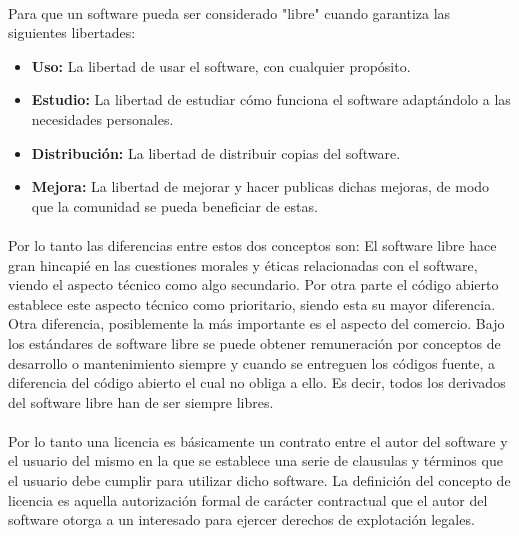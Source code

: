 \documentclass[10pt]{article}
\begin{document}
            \paragraph{}
            Para que un software pueda ser considerado "libre" cuando garantiza las siguientes libertades:
            \begin{itemize}
            \item \textbf{Uso:} La libertad de usar el software, con cualquier propósito.
            \item \textbf{Estudio:} La libertad de estudiar cómo funciona el software adaptándolo a las necesidades personales.
            \item \textbf{Distribución:} La libertad de distribuir copias del software.
            \item \textbf{Mejora:} La libertad de mejorar y hacer publicas dichas mejoras, de modo que la comunidad se pueda beneficiar de estas.
            \end{itemize}
            
            \paragraph{}
            Por lo tanto las diferencias entre estos dos conceptos son: El software libre hace gran hincapié en las cuestiones morales y éticas relacionadas con el software, viendo el aspecto técnico como algo secundario. Por otra parte el código abierto establece este aspecto técnico como prioritario, siendo esta su mayor diferencia. Otra diferencia, posiblemente la más importante es el aspecto del comercio. Bajo los estándares de software libre se puede obtener remuneración por conceptos de desarrollo o mantenimiento siempre y cuando se entreguen los códigos fuente, a diferencia del código abierto el cual no obliga a ello. Es decir, todos los derivados del software libre han de ser siempre libres.
            
            \paragraph{}
            Por lo tanto una licencia es básicamente un contrato entre el autor del software y el usuario del mismo en la que se establece una serie de clausulas y términos que el usuario debe cumplir para utilizar dicho software. La definición del concepto de licencia es aquella autorización formal de carácter contractual que el autor del software otorga a un interesado para ejercer derechos de explotación legales.
            
\end{document}
